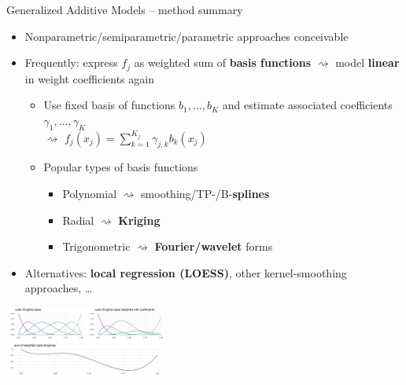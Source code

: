 \begin{vbframe}{Generalized Additive Models -- method summary}
\begin{itemize}
  \item Nonparametric/semiparametric/parametric approaches conceivable
  \item Frequently: express $f_j$ as weighted sum of \textbf{basis functions}
  $\rightsquigarrow$ model \textbf{linear} in weight coefficients again
  \begin{itemize}
      \item Use fixed basis of functions $b_1, \dots, b_K$ and estimate
      associated coefficients $\gamma_1, \dots, \gamma_K$ \\ $\rightsquigarrow$
      $f_j(x_j) = \sum_{k=1}^{K_j} \gamma_{j, k} b_k(x_j)$
      \item Popular types of basis functions
      \begin{itemize}
        \footnotesize
        \item Polynomial $\rightsquigarrow$ smoothing/TP-/B-\textbf{splines}
        \item Radial $\rightsquigarrow$ \textbf{Kriging}
        \item Trigonometric $\rightsquigarrow$ \textbf{Fourier/wavelet} forms
      \end{itemize}
    \end{itemize}
    \item Alternatives: \textbf{local regression (LOESS)}, other
    kernel-smoothing approaches, \dots
\end{itemize}

\includegraphics[width=0.4\textwidth]{figure/bspline-basis}

\end{vbframe}


